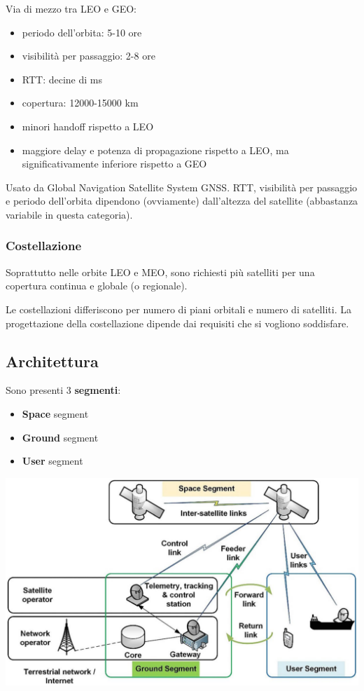 Via di mezzo tra LEO e GEO:
\begin{itemize}
	\item periodo dell'orbita: 5-10 ore

	\item visibilità per passaggio: 2-8 ore

	\item RTT: decine di ms

	\item copertura: 12000-15000 km

	\item minori handoff rispetto a LEO

	\item maggiore delay e potenza di propagazione rispetto a LEO, ma significativamente inferiore rispetto a GEO
\end{itemize}

Usato da Global Navigation Satellite System GNSS. RTT, visibilità per passaggio e periodo dell'orbita dipendono (ovviamente) dall'altezza del satellite (abbastanza variabile in questa categoria).

\subsubsection{Costellazione}

Soprattutto nelle orbite LEO e MEO, sono richiesti più satelliti per una copertura continua e globale (o regionale). 

Le costellazioni differiscono per numero di piani orbitali e numero di satelliti. La progettazione della costellazione dipende dai requisiti che si vogliono soddisfare.

\subsection{Architettura}

Sono presenti 3 \textbf{segmenti}:
\begin{itemize}
	\item \textbf{Space} segment
	
    \item \textbf{Ground} segment

	\item \textbf{User} segment
\end{itemize}

\begin{center}
	\includegraphics[width=0.7\linewidth]{img/sat/arch}
\end{center}

